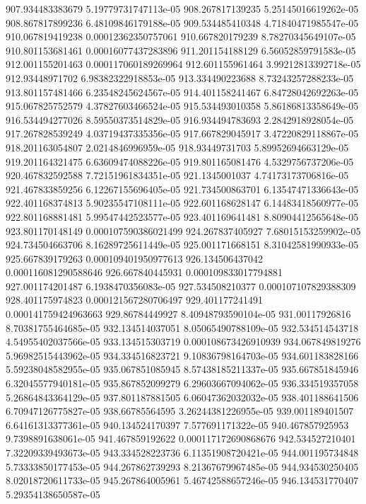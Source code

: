 {907.934483383679 5.19779731747113e-05
908.267817139235 5.25145016619262e-05
908.867817899236 6.48109846179188e-05
909.534485410348 4.71840471985547e-05
910.067819419238 0.00012362350757061
910.667820179239 8.78270345649107e-05
910.801153681461 0.00016077437283896
911.201154188129 6.56052859791583e-05
912.001155201463 0.000117060189269964
912.601155961464 3.99212813392718e-05
912.93448971702 6.98382322918853e-05
913.334490223688 8.73243257288233e-05
913.801157481466 6.23548245624567e-05
914.401158241467 6.84728042692263e-05
915.067825752579 4.37827603466524e-05
915.534493010358 5.86186813358649e-05
916.534494277026 8.59550373514829e-05
916.934494783693 2.2842918928054e-05
917.267828539249 4.03719437335356e-05
917.667829045917 3.47220829118867e-05
918.201163054807 2.0214846996959e-05
918.93449731703 5.89952694663129e-05
919.201164321475 6.63609474088226e-05
919.801165081476 4.5329756737206e-05
920.467832592588 7.72151961834351e-05
921.1345001037 4.74173173706816e-05
921.467833859256 6.12267155696405e-05
921.734500863701 6.13547471336643e-05
922.401168374813 5.90235547108111e-05
922.601168628147 6.14483418560977e-05
922.801168881481 5.99547442523577e-05
923.401169641481 8.80904412565648e-05
923.801170148149 0.000107590386021499
924.267837405927 7.68015153259902e-05
924.734504663706 8.16289725611449e-05
925.001171668151 8.31042581990933e-05
925.667839179263 0.000109401950977613
926.134506437042 0.000116081290588646
926.667840445931 0.000109833017794881
927.001174201487 6.1938470356083e-05
927.534508210377 0.000107107829388309
928.401175974823 0.000121567280706497
929.401177241491 0.000141759424963663
929.86784449927 8.40948793590104e-05
931.00117926816 8.70381755464685e-05
932.134514037051 8.05065490788109e-05
932.534514543718 4.54955402037566e-05
933.134515303719 0.000108673426910939
934.067849819276 5.96982515443962e-05
934.334516823721 9.10836798164703e-05
934.601183828166 5.59238048582955e-05
935.067851085945 8.57438185211337e-05
935.667851845946 6.32045577940181e-05
935.867852099279 6.29603667094062e-05
936.334519357058 5.26864843364129e-05
937.801187881505 6.06047362032032e-05
938.401188641506 6.70947126775827e-05
938.66785564595 3.26244381226955e-05
939.001189401507 6.64161313377361e-05
940.134524170397 7.577691171322e-05
940.467857925953 9.7398891638061e-05
941.467859192622 0.000117172690868676
942.534527210401 7.32209339493673e-05
943.334528223736 6.11351908720421e-05
944.001195734848 5.73333850177453e-05
944.267862739293 8.21367679967485e-05
944.934530250405 8.02018720611733e-05
945.267864005961 5.46742588657246e-05
946.134531770407 5.29354138650587e-05
}
